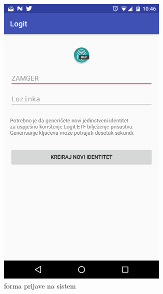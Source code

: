\begin{figure}[H]
    \centering
    \begin{subfigure}{.5\textwidth}
        \centering
        \includegraphics[width=0.9\textwidth]{material/00-login}
        \caption{forma prijave na sistem}
        \label{img:ui_l}
    \end{subfigure}%
    \begin{subfigure}{.5\textwidth}
        \centering

\end{subfigure}
\end{figure}
